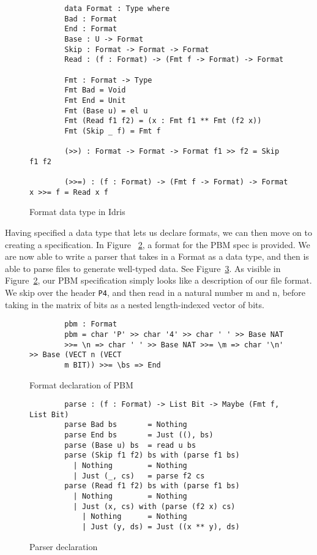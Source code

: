 \begin{figure}[ht!!!!!!]
    \caption{Format data type in Idris \protect\cite{power_of_pi}}
    \label{formatDeclaration}
    \begin{lstlisting}
        data Format : Type where 
        Bad : Format 
        End : Format
        Base : U -> Format
        Skip : Format -> Format -> Format 
        Read : (f : Format) -> (Fmt f -> Format) -> Format

        Fmt : Format -> Type 
        Fmt Bad = Void 
        Fmt End = Unit 
        Fmt (Base u) = el u
        Fmt (Read f1 f2) = (x : Fmt f1 ** Fmt (f2 x)) 
        Fmt (Skip _ f) = Fmt f

        (>>) : Format -> Format -> Format f1 >> f2 = Skip f1 f2

        (>>=) : (f : Format) -> (Fmt f -> Format) -> Format x >>= f = Read x f
    \end{lstlisting}
\end{figure}

Having specified a data type that lets us declare formats, we can then move on
to creating a specification. In Figure ~\ref{spec_declaration}, a format for the
PBM spec is provided. We are now able to write a parser that takes in a Format
as a data type, and then is able to parse files to generate well-typed data. See
Figure~\ref{parser}. As visible in Figure~\ref{spec_declaration}, our PBM
specification simply looks like a description of our file format. We skip over
the header \texttt{P4}, and then read in a natural number m and n, before taking
in the matrix of bits as a nested length-indexed vector of bits. 

\begin{figure}[ht!!!!!!!!!!]
    \caption{Format declaration of PBM \protect\cite{power_of_pi}}
    \label{spec_declaration}
    \begin{lstlisting}
        pbm : Format 
        pbm = char 'P' >> char '4' >> char ' ' >> Base NAT
        >>= \n => char ' ' >> Base NAT >>= \m => char '\n' >> Base (VECT n (VECT
        m BIT)) >>= \bs => End
    \end{lstlisting}
\end{figure}


\begin{figure}[ht!!!!!]
    \caption{Parser declaration \protect\cite{power_of_pi}}
    \label{parser}
    \begin{lstlisting}
        parse : (f : Format) -> List Bit -> Maybe (Fmt f, List Bit)
        parse Bad bs       = Nothing
        parse End bs       = Just ((), bs)
        parse (Base u) bs  = read u bs
        parse (Skip f1 f2) bs with (parse f1 bs)
          | Nothing        = Nothing
          | Just (_, cs)   = parse f2 cs
        parse (Read f1 f2) bs with (parse f1 bs)
          | Nothing        = Nothing
          | Just (x, cs) with (parse (f2 x) cs)
            | Nothing      = Nothing
            | Just (y, ds) = Just ((x ** y), ds)
    \end{lstlisting}
\end{figure}

